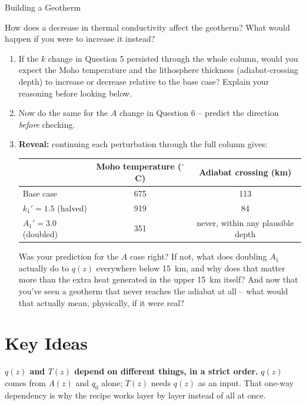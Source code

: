 \begin{activity}{Building a Geotherm}
\begin{questions}
  How does a decrease in thermal conductivity affect the geotherm?  What would happen if you were to increase it instead?
  \answerbox[3cm]

  \begin{enumerate}[label=(\alph*)]
    \item If the $k$ change in Question 5 persisted through the whole column, would you expect the Moho temperature and the lithosphere thickness (adiabat-crossing depth) to increase or decrease relative to the base case? Explain your reasoning before looking below.
    \answerbox[2.5cm]

    \item Now do the same for the $A$ change in Question 6 -- predict the direction \emph{before} checking.
    \answerbox[2.5cm]

    \item \textbf{Reveal:} continuing each perturbation through the full column gives:
    \begin{center}
    \begin{tabular}{lcc}
      \toprule
      & Moho temperature ($^\circ$C) & Adiabat crossing (km) \\
      \midrule
      Base case                 & 675 & 113 \\
      $k_1'=1.5$ (halved)       & 919 & 84  \\
      $A_1'=3.0$ (doubled)      & 351 & never, within any plausible depth \\
      \bottomrule
    \end{tabular}
    \end{center}
    Was your prediction for the $A$ case right? If not, what does doubling $A_1$ actually do to $q(z)$ everywhere below 15~km, and why does that matter more than the extra heat generated in the upper 15~km itself? And now that you've seen a geotherm that never reaches the adiabat at all -- what would that actually mean, physically, if it were real?
    \answerbox[3cm]
  \end{enumerate}

\end{questions}

\section*{Key Ideas}

\textbf{$q(z)$ and $T(z)$ depend on different things, in a strict order.} $q(z)$ comes from $A(z)$ and $q_0$ alone; $T(z)$ needs $q(z)$ as an input. That one-way dependency is why the recipe works layer by layer instead of all at once.


\end{activity}

